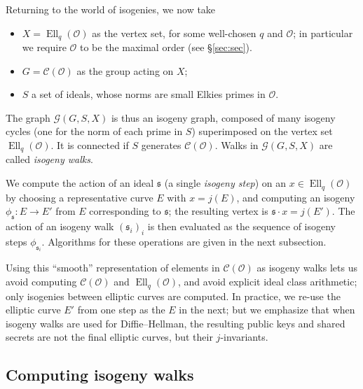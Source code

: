 \documentclass{llncs}
\newcommand{\Cl}{\mathcal{C}}
\newcommand{\Graph}{\mathcal{G}}
\renewcommand{\O}{\mathcal{O}}
\renewcommand{\frak}{\mathfrak}
\DeclareMathOperator{\Ell}{Ell}
\begin{document}
Returning to the world of isogenies,
we now take
\begin{itemize}
    \item $X=\Ell_q(\O)$ as the vertex set, for some well-chosen $q$ and $\O$;
        in particular we require $\O$ to be the maximal order (see \S\ref{sec:sec}).
    \item $G=\Cl(\O)$ as the group acting on $X$;
    \item $S$ a set of ideals, whose norms are small Elkies primes in $\O$.
\end{itemize}
The graph $\Graph(G,S,X)$ is thus an isogeny graph, 
composed of many isogeny cycles (one for the norm of each prime in $S$) 
superimposed on the vertex set $\Ell_q(\O)$.
It is connected if $S$ generates $\Cl(\O)$.
Walks in $\Graph(G,S,X)$ are called \emph{isogeny walks}.

We compute the action of
an ideal $\frak s$ (a single \emph{isogeny step})
on an $x∈\Ell_q(\O)$ 
by choosing a representative curve $E$ with $x = j(E)$,
and computing an isogeny $ϕ_{\frak s}:E→E'$ from $E$
corresponding to $\frak{s}$;
the resulting vertex is $\frak s \cdot x = j(E')$.
The action of an isogeny walk $(\frak s_i)_i$
is then evaluated as the sequence of isogeny steps $ϕ_{\frak s_i}$. 
Algorithms for these operations are given in the next subsection. 

Using this ``smooth'' representation of elements
in $\Cl(\O)$ as isogeny walks
lets us avoid computing $\Cl(\O)$ and $\Ell_q(\O)$,
and avoid explicit ideal class arithmetic;
only isogenies between elliptic curves are computed.
In practice, we re-use the elliptic curve $E'$ from one step
as the $E$ in the next;
but we emphasize that
when isogeny walks are used for Diffie--Hellman,
the resulting public keys and shared secrets
are not the final elliptic curves,
but their $j$-invariants.


\subsection{Computing isogeny walks}
\end{document}
